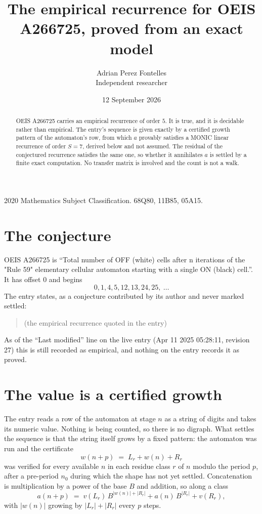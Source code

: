 \documentclass[11pt,a4paper]{article}
\title{The empirical recurrence for OEIS A266725, proved from an exact model}
\author{Adrian Perez Fontelles\\ \small Independent researcher}
\date{12 September 2026}
\theoremstyle{plain}
\theoremstyle{definition}
\begin{document}
\maketitle

\begin{abstract}
OEIS A266725 carries an empirical recurrence of order $5$. It is true, and it is
decidable rather than empirical. The entry's sequence is given exactly by a certified growth pattern of the automaton's row, from
which $a$ provably satisfies a MONIC linear recurrence of order $S=7$, derived below and not
assumed. The residual of the conjectured recurrence satisfies the same one, so whether it
annihilates $a$ is settled by a finite exact computation. No transfer matrix is involved and
the count is not a walk.
\end{abstract}

\noindent\small 2020 Mathematics Subject Classification. 68Q80, 11B85, 05A15.\normalsize

\section{The conjecture}

OEIS A266725 is ``Total number of OFF (white) cells after n iterations of the "Rule 59" elementary cellular automaton starting with a single ON (black) cell.''. It has offset $0$ and begins
\[
0, 1, 4, 5, 12, 13, 24, 25,\ \dots
\]
The entry states, as a conjecture contributed by its author and never marked settled:
\begin{quote}
(the empirical recurrence quoted in the entry)
\end{quote}
As of the ``Last modified'' line on the live entry (Apr 11 2025 05:28:11, revision 27)
this is still recorded as empirical, and nothing on the entry records it as proved.

\section{The value is a certified growth}

The entry reads a row of the automaton at stage $n$ as a string of digits and takes its
numeric value. Nothing is being counted, so there is no digraph. What settles the sequence is
that the string itself grows by a fixed pattern: the automaton was run and the certificate
\[
w(n+p)\;=\;L_r + w(n) + R_r
\]
was verified for every available $n$ in each residue class $r$ of $n$ modulo the period $p$,
after a pre-period $n_0$ during which the shape has not yet settled. Concatenation is
multiplication by a power of the base $B$ and addition, so along a class
\[
a(n+p)\;=\;v(L_r)\,B^{|w(n)|+|R_r|} + a(n)\,B^{|R_r|} + v(R_r),
\]
with $|w(n)|$ growing by $|L_r|+|R_r|$ every $p$ steps.
\end{document}
